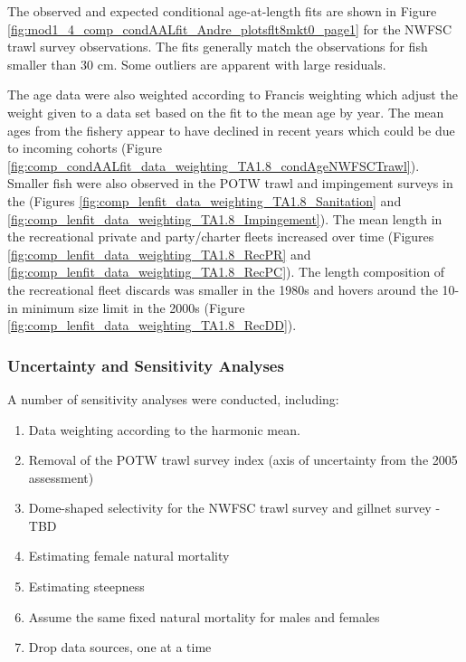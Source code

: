 \documentclass[12pt,]{article}
\begin{document}
The observed and expected conditional age-at-length fits are shown in
Figure \ref{fig:mod1_4_comp_condAALfit_Andre_plotsflt8mkt0_page1} for
the NWFSC trawl survey observations. The fits generally match the
observations for fish smaller than 30 cm. Some outliers are apparent
with large residuals.

The age data were also weighted according to Francis weighting which
adjust the weight given to a data set based on the fit to the mean age
by year. The mean ages from the fishery appear to have declined in
recent years which could be due to incoming cohorts (Figure
\ref{fig:comp_condAALfit_data_weighting_TA1.8_condAgeNWFSCTrawl}).\\
Smaller fish were also observed in the POTW trawl and impingement
surveys in the (Figures
\ref{fig:comp_lenfit_data_weighting_TA1.8_Sanitation} and
\ref{fig:comp_lenfit_data_weighting_TA1.8_Impingement}). The mean length
in the recreational private and party/charter fleets increased over time
(Figures \ref{fig:comp_lenfit_data_weighting_TA1.8_RecPR} and
\ref{fig:comp_lenfit_data_weighting_TA1.8_RecPC}). The length
composition of the recreational fleet discards was smaller in the 1980s
and hovers around the 10-in minimum size limit in the 2000s (Figure
\ref{fig:comp_lenfit_data_weighting_TA1.8_RecDD}).

\subsubsection{Uncertainty and Sensitivity
Analyses}\label{uncertainty-and-sensitivity-analyses}

A number of sensitivity analyses were conducted, including:

\begin{enumerate}

  \item Data weighting according to the harmonic mean.
  
  \item Removal of the POTW trawl survey index (axis of uncertainty from the 2005 assessment)
  
  \item Dome-shaped selectivity for the NWFSC trawl survey and gillnet survey - TBD
  
  \item Estimating female natural mortality
  
  \item Estimating steepness
  
  \item Assume the same fixed natural mortality for males and females
  
  \item Drop data sources, one at a time
  
  
\end{enumerate}
\end{document}
